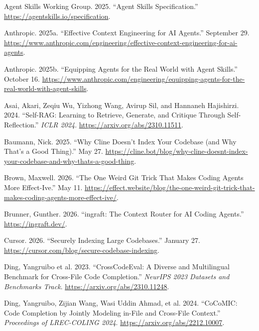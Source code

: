 \documentclass[
  11pt,
  letterpaper,
  numbers=noendperiod,
  parskip=half]{scrartcl}
\newlength{\cslhangindent}
\newenvironment{CSLReferences}[2] %
 {\begin{list}{}{%
  \setlength{\itemindent}{0pt}
  \setlength{\leftmargin}{0pt}
  \setlength{\parsep}{0pt}
  \ifodd #1
   \setlength{\leftmargin}{\cslhangindent}
   \setlength{\itemindent}{-1\cslhangindent}
  \fi
  \setlength{\itemsep}{#2\baselineskip}}}
 {\end{list}}
\begin{document}
\protect{}\label{refs}
\begin{CSLReferences}{1}{1}
Agent Skills Working Group. 2025. {``Agent Skills Specification.''}
\url{https://agentskills.io/specification}.

Anthropic. 2025a. {``Effective Context Engineering for {AI} Agents.''}
September 29.
\url{https://www.anthropic.com/engineering/effective-context-engineering-for-ai-agents}.

Anthropic. 2025b. {``Equipping Agents for the Real World with Agent
Skills.''} October 16.
\url{https://www.anthropic.com/engineering/equipping-agents-for-the-real-world-with-agent-skills}.

Asai, Akari, Zeqiu Wu, Yizhong Wang, Avirup Sil, and Hannaneh
Hajishirzi. 2024. {``Self-{RAG}: Learning to Retrieve, Generate, and
Critique Through Self-Reflection.''} \emph{ICLR 2024}.
\url{https://arxiv.org/abs/2310.11511}.

Baumann, Nick. 2025. {``Why {Cline} Doesn't Index Your Codebase (and Why
That's a Good Thing).''} May 27.
\url{https://cline.bot/blog/why-cline-doesnt-index-your-codebase-and-why-thats-a-good-thing}.

Brown, Maxwell. 2026. {``The One Weird Git Trick That Makes Coding
Agents More {Effect}-Ive.''} May 11.
\url{https://effect.website/blog/the-one-weird-git-trick-that-makes-coding-agents-more-effect-ive/}.

Brunner, Gunther. 2026. {``{ingraft}: The Context Router for {AI} Coding
Agents.''} \url{https://ingraft.dev/}.

Cursor. 2026. {``Securely Indexing Large Codebases.''} January 27.
\url{https://cursor.com/blog/secure-codebase-indexing}.

{Ding, Yangruibo et al.} 2023. {``{CrossCodeEval}: A Diverse and
Multilingual Benchmark for Cross-File Code Completion.''} \emph{NeurIPS
2023 Datasets and Benchmarks Track}.
\url{https://arxiv.org/abs/2310.11248}.

Ding, Yangruibo, Zijian Wang, Wasi Uddin Ahmad, et al. 2024.
{``{CoCoMIC}: Code Completion by Jointly Modeling in-File and Cross-File
Context.''} \emph{Proceedings of LREC-COLING 2024}.
\url{https://arxiv.org/abs/2212.10007}.


\end{CSLReferences}
\end{document}
